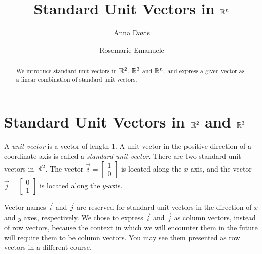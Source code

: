 \documentclass{ximera}
\author{Anna Davis \and Rosemarie Emanuele} \title{Standard Unit Vectors in $\mathbb{R}^n$} \license{CC-BY 4.0}
\begin{document}
\begin{abstract}
 We introduce standard unit vectors in $\mathbb{R}^2$, $\mathbb{R}^3$ and $\mathbb{R}^n$, and express a given vector as a linear combination of standard unit vectors. 
\end{abstract}
\maketitle



\section*{Standard Unit Vectors in $\mathbb{R}^2$ and $\mathbb{R}^3$} 
A {\it unit vector} is a vector of length 1.  A unit vector in the positive direction of a coordinate axis is called a {\it standard unit vector}.  There are two standard unit vectors in $\mathbb{R}^2$.  The vector $\vec{i}=\begin{bmatrix}
1\\
0
\end{bmatrix}$ is located along the $x$-axis, and the vector $\vec{j}=\begin{bmatrix}
0\\
1
\end{bmatrix}$ is located along the $y$-axis.  

\begin{image}[1.5in]
\end{image}

Vector names $\vec{i}$ and $\vec{j}$ are reserved for standard unit vectors in the direction of $x$ and $y$ axes, respectively.  We chose to express $\vec{i}$ and $\vec{j}$ as column vectors, instead of row vectors, because the context in which we will encounter them in the future will require them to be column vectors.  You may see them presented as row vectors in a different course.
\end{document}
